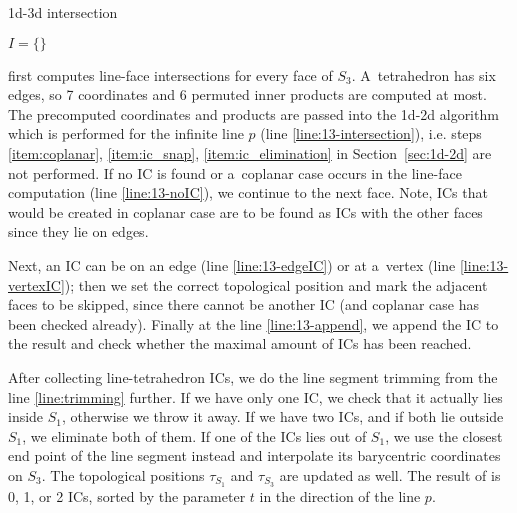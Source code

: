 \begin{algorithm}
  \caption{1d-3d intersection}
  \label{algo:13d}

  \DontPrintSemicolon
  $I=\{\}$\; 
   \label{line:trimming}
\end{algorithm}
 first computes line-face intersections for every face of $S_3$.
A~tetrahedron has six edges, so 7 \plucker coordinates and 6 permuted inner products are computed at most. 
The precomputed coordinates and products are passed into the 1d-2d algorithm which is performed for the infinite 
line $p$ (line \ref{line:13-intersection}), i.e. steps \ref{item:coplanar}, \ref{item:ic_snap}, \ref{item:ic_elimination} in Section~\ref{sec:1d-2d} are not performed.
If no IC is found or a~coplanar case occurs in the line-face computation (line \ref{line:13-noIC}), we continue to the next face. Note, ICs that would 
be created in coplanar case are to be found as ICs with the other faces since they lie on edges.

Next, an IC can be on an edge (line \ref{line:13-edgeIC}) or at a~vertex (line \ref{line:13-vertexIC}); then we set the correct topological position and mark the adjacent faces
to be skipped, since there cannot be another IC (and coplanar case has been checked already).
Finally at the line \ref{line:13-append}, we append the IC to the result and check whether the maximal amount of 
ICs has been reached.

After collecting line-tetrahedron ICs,
we do the line segment trimming from the line \ref{line:trimming} further. 
If we have only one IC, we check that it actually lies inside $S_1$, otherwise we throw it away.
If we have two ICs, and if both lie outside $S_1$, we eliminate both of them. 
If one of the ICs lies out of $S_1$,
we use the closest end point of the line segment instead and interpolate its barycentric coordinates on $S_3$.
The topological positions $\tau_{S_1}$ and $\tau_{S_3}$ are updated as well.
The result of  is 0, 1, or 2 ICs, sorted by the parameter $t$ in the direction of the line $p$.



